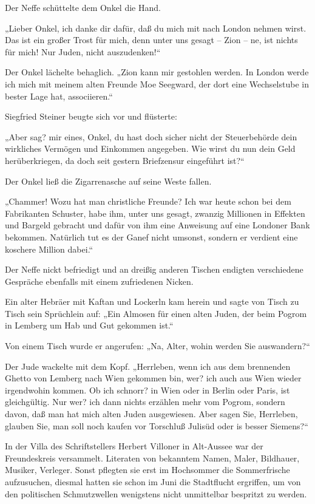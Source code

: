 Der Neffe schüttelte dem Onkel die Hand.

„Lieber Onkel, ich danke dir dafür, daß du mich mit nach London
nehmen wirst. Das ist ein großer Trost für mich, denn unter uns
gesagt – Zion – ne, ist nichts für mich! Nur Juden, nicht
auszudenken!“

Der Onkel lächelte behaglich. „Zion kann mir gestohlen werden. In
London werde ich mich mit meinem alten Freunde Moe Seegward, der
dort eine Wechselstube in bester Lage hat, associieren.“

Siegfried Steiner beugte sich vor und flüsterte:

„Aber sag? mir eines, Onkel, du hast doch sicher
nicht der Steuerbehörde dein wirkliches Vermögen und Einkommen
angegeben. Wie wirst du nun dein Geld herüberkriegen, da doch seit
gestern Briefzensur eingeführt ist?“

Der Onkel ließ die Zigarrenasche auf seine Weste fallen.

„Chammer! Wozu hat man christliche Freunde? Ich war heute schon bei
dem Fabrikanten Schuster, habe ihm, unter uns gesagt, zwanzig
Millionen in Effekten und Bargeld gebracht und dafür von ihm eine
Anweisung auf eine Londoner Bank bekommen. Natürlich tut es der
Ganef nicht umsonst, sondern er verdient eine koschere Million
dabei.“

Der Neffe nickt befriedigt und an dreißig anderen Tischen endigten
verschiedene Gespräche ebenfalls mit einem zufriedenen Nicken.

Ein alter Hebräer mit Kaftan und Lockerln kam herein und sagte von
Tisch zu Tisch sein Sprüchlein auf: „Ein Almosen für einen alten
Juden, der beim Pogrom in Lemberg um Hab und Gut gekommen ist.“

Von einem Tisch wurde er angerufen: „Na, Alter, wohin werden Sie
auswandern?“

Der Jude wackelte mit dem Kopf. „Herrleben, wenn ich aus dem
brennenden Ghetto von Lemberg nach Wien gekommen bin, wer? ich auch
aus Wien wieder irgendwohin kommen. Ob ich schnorr? in Wien oder in
Berlin oder Paris, ist gleichgültig. Nur wer? ich dann nichts
erzählen mehr vom Pogrom, sondern davon, daß man hat mich alten
Juden ausgewiesen. Aber sagen Sie, Herrleben, 
glauben Sie, man soll noch kaufen vor Torschluß Julisüd oder is
besser Siemens?“

\tb{* * *}
In der Villa des Schriftstellers Herbert Villoner in Alt-Aussee war
der Freundeskreis versammelt. Literaten von bekanntem Namen, Maler,
Bildhauer, Musiker, Verleger. Sonst pflegten sie erst im Hochsommer
die Sommerfrische aufzusuchen, diesmal hatten sie schon im Juni die
Stadtflucht ergriffen, um von den politischen Schmutzwellen
wenigstens nicht unmittelbar bespritzt zu werden.

